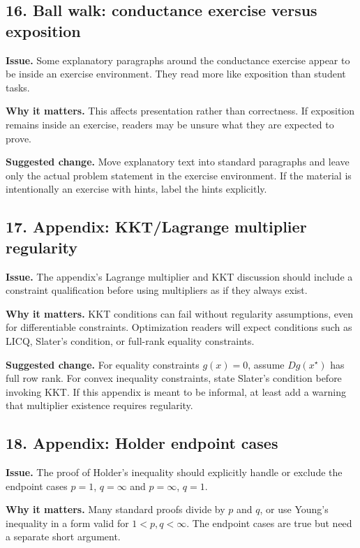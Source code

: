 \documentclass[11pt]{article}
\begin{document}
\subsection*{16. Ball walk: conductance exercise versus exposition}

\textbf{Issue.}  Some explanatory paragraphs around the conductance exercise appear to be inside an exercise environment.  They read more like exposition than student tasks.

\textbf{Why it matters.}  This affects presentation rather than correctness.  If exposition remains inside an exercise, readers may be unsure what they are expected to prove.

\textbf{Suggested change.}  Move explanatory text into standard paragraphs and leave only the actual problem statement in the exercise environment.  If the material is intentionally an exercise with hints, label the hints explicitly.

\subsection*{17. Appendix: KKT/Lagrange multiplier regularity}

\textbf{Issue.}  The appendix's Lagrange multiplier and KKT discussion should include a constraint qualification before using multipliers as if they always exist.

\textbf{Why it matters.}  KKT conditions can fail without regularity assumptions, even for differentiable constraints.  Optimization readers will expect conditions such as LICQ, Slater's condition, or full-rank equality constraints.

\textbf{Suggested change.}  For equality constraints \(g(x)=0\), assume \(Dg(x^\star)\) has full row rank.  For convex inequality constraints, state Slater's condition before invoking KKT.  If this appendix is meant to be informal, at least add a warning that multiplier existence requires regularity.

\subsection*{18. Appendix: Holder endpoint cases}

\textbf{Issue.}  The proof of Holder's inequality should explicitly handle or exclude the endpoint cases \(p=1\), \(q=\infty\) and \(p=\infty\), \(q=1\).

\textbf{Why it matters.}  Many standard proofs divide by \(p\) and \(q\), or use Young's inequality in a form valid for \(1<p,q<\infty\).  The endpoint cases are true but need a separate short argument.
\end{document}
